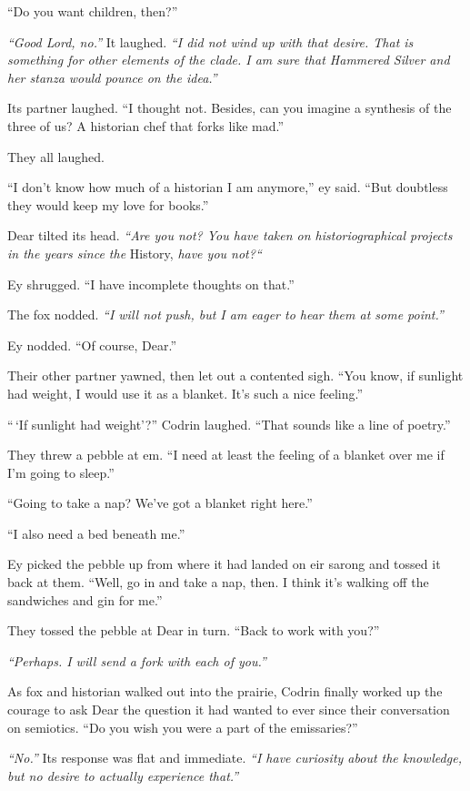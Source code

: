 ``Do you want children, then?''

\emph{``Good Lord, no.''} It laughed. \emph{``I did not wind up with that desire. That is something for other elements of the clade. I am sure that Hammered Silver and her stanza would pounce on the idea.''}

Its partner laughed. ``I thought not. Besides, can you imagine a synthesis of the three of us? A historian chef that forks like mad.''

They all laughed.

``I don't know how much of a historian I am anymore,'' ey said. ``But doubtless they would keep my love for books.''

Dear tilted its head. \emph{``Are you not? You have taken on historiographical projects in the years since the} History, \emph{have you not?{}``}

Ey shrugged. ``I have incomplete thoughts on that.''

The fox nodded. \emph{``I will not push, but I am eager to hear them at some point.''}

Ey nodded. ``Of course, Dear.''

Their other partner yawned, then let out a contented sigh. ``You know, if sunlight had weight, I would use it as a blanket. It's such a nice feeling.''

``\,`If sunlight had weight'?'' Codrin laughed. ``That sounds like a line of poetry.''

They threw a pebble at em. ``I need at least the feeling of a blanket over me if I'm going to sleep.''

``Going to take a nap? We've got a blanket right here.''

``I also need a bed beneath me.''

Ey picked the pebble up from where it had landed on eir sarong and tossed it back at them. ``Well, go in and take a nap, then. I think it's walking off the sandwiches and gin for me.''

They tossed the pebble at Dear in turn. ``Back to work with you?''

\emph{``Perhaps. I will send a fork with each of you.''}

As fox and historian walked out into the prairie, Codrin finally worked up the courage to ask Dear the question it had wanted to ever since their conversation on semiotics. ``Do you wish you were a part of the emissaries?''

\emph{``No.''} Its response was flat and immediate. \emph{``I have curiosity about the knowledge, but no desire to actually experience that.''}

